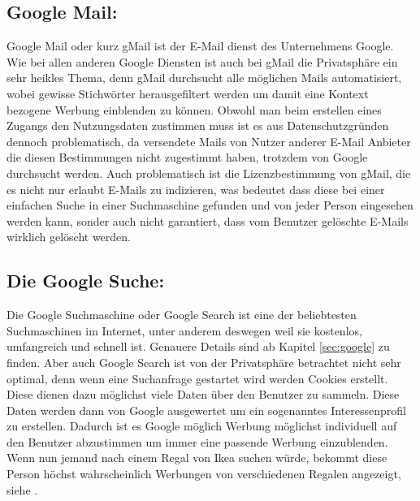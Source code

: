 \documentclass[12pt, a4paper]{llncs}
\begin{document}
	\subsection{Google Mail:}
	Google Mail oder kurz gMail ist der E-Mail dienst des Unternehmens Google. Wie bei allen anderen Google Diensten ist auch bei gMail die Privatsphäre ein sehr heikles Thema, denn gMail durchsucht alle möglichen Mails automatisiert, wobei gewisse Stichwörter herausgefiltert werden um damit eine Kontext bezogene Werbung einblenden zu können. Obwohl man beim erstellen eines Zugangs den Nutzungsdaten zustimmen muss ist es aus Datenschutzgründen dennoch problematisch, da versendete Mails von Nutzer anderer E-Mail Anbieter die diesen Bestimmungen nicht zugestimmt haben, trotzdem von Google durchsucht werden. Auch problematisch ist die Lizenzbestimmung von gMail, die es nicht nur erlaubt E-Mails zu indizieren, was bedeutet dass diese bei einer einfachen Suche in einer Suchmaschine gefunden und von jeder Person eingesehen werden kann, sonder auch nicht garantiert, dass vom Benutzer gelöschte E-Mails wirklich gelöscht werden.
	\\
	\subsection{Die Google Suche:}
	\label{sec:search}
	Die Google Suchmaschine oder Google Search ist eine der beliebtesten Suchmaschinen im Internet, unter anderem deswegen weil sie kostenlos, umfangreich und schnell ist. Genauere Details sind ab Kapitel \ref{sec:google} zu finden. Aber auch Google Search ist von der Privatsphäre betrachtet nicht sehr optimal, denn wenn eine Suchanfrage gestartet wird werden Cookies erstellt. Diese dienen dazu möglichst viele Daten über den Benutzer zu sammeln. Diese Daten werden dann von Google ausgewertet um ein sogenanntes Interessenprofil zu erstellen. Dadurch ist es Google möglich Werbung möglichst individuell auf den Benutzer abzustimmen um immer eine passende Werbung einzublenden. Wenn nun jemand nach einem Regal von Ikea suchen würde, bekommt diese Person höchst wahrscheinlich Werbungen von verschiedenen Regalen angezeigt, siehe \cite{3}.
\end{document}
